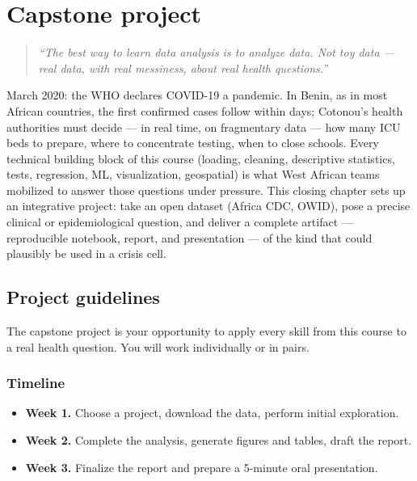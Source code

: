 \chapter{Capstone project}
\label{ch:capstone}

\begin{quote}
\emph{``The best way to learn data analysis is to analyze data. Not toy data --- real data, with real messiness, about real health questions.''}
\end{quote}

March 2020: the WHO declares COVID-19 a pandemic. In Benin, as in most African countries, the first confirmed cases follow within days; Cotonou's health authorities must decide --- in real time, on fragmentary data --- how many ICU beds to prepare, where to concentrate testing, when to close schools. Every technical building block of this course (loading, cleaning, descriptive statistics, tests, regression, ML, visualization, geospatial) is what West African teams mobilized to answer those questions under pressure. This closing chapter sets up an integrative project: take an open dataset (Africa CDC, OWID), pose a precise clinical or epidemiological question, and deliver a complete artifact --- reproducible notebook, report, and presentation --- of the kind that could plausibly be used in a crisis cell.

\section{Project guidelines}

The capstone project is your opportunity to apply every skill from this course to a real health question. You will work individually or in pairs.

\subsection{Timeline}

\begin{itemize}
  \item \textbf{Week 1.} Choose a project, download the data, perform initial exploration.
  \item \textbf{Week 2.} Complete the analysis, generate figures and tables, draft the report.
  \item \textbf{Week 3.} Finalize the report and prepare a 5-minute oral presentation.
\end{itemize}

